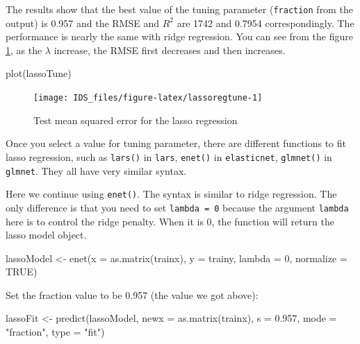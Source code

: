 \documentclass[
  12pt,
]{krantz}
\makeatletter
\newenvironment{Shaded}{\begin{snugshade}}{\end{snugshade}}
\newcommand{\AttributeTok}[1]{\textcolor[rgb]{0.61,0.61,0.61}{#1}}
\newcommand{\ConstantTok}[1]{\textcolor[rgb]{0,0,0}{#1}}
\newcommand{\DecValTok}[1]{\textcolor[rgb]{0.06,0.06,0.06}{#1}}
\newcommand{\FloatTok}[1]{\textcolor[rgb]{0.06,0.06,0.06}{#1}}
\newcommand{\FunctionTok}[1]{\textcolor[rgb]{0,0,0}{#1}}
\newcommand{\NormalTok}[1]{#1}
\newcommand{\OtherTok}[1]{\textcolor[rgb]{0.37,0.37,0.37}{#1}}
\newcommand{\StringTok}[1]{\textcolor[rgb]{0.5,0.5,0.5}{#1}}
\newenvironment{kframe}{%
\medskip{}
\setlength{\fboxsep}{.8em}
 \def\at@end@of@kframe{}%
 \ifinner\ifhmode%
  \def\at@end@of@kframe{\end{minipage}}%
  \begin{minipage}{\columnwidth}%
 \fi\fi%
 \def\FrameCommand##1{\hskip\@totalleftmargin \hskip-\fboxsep
 \colorbox{shadecolor}{##1}\hskip-\fboxsep
     \hskip-\linewidth \hskip-\@totalleftmargin \hskip\columnwidth}%
 \MakeFramed {\advance\hsize-\width
   \@totalleftmargin\z@ \linewidth\hsize
   \@setminipage}}%
 {\par\unskip\endMakeFramed%
 \at@end@of@kframe}
\renewenvironment{Shaded}{\begin{kframe}}{\end{kframe}}
\makeatother
\begin{document}
The results show that the best value of the tuning parameter (\texttt{fraction} from the output) is 0.957 and the RMSE and \(R^{2}\) are 1742 and 0.7954 correspondingly. The performance is nearly the same with ridge regression. You can see from the figure \ref{fig:lassoregtune}, as the \(\lambda\) increase, the RMSE first decreases and then increases.

\begin{Shaded}
\begin{Highlighting}[]
\FunctionTok{plot}\NormalTok{(lassoTune)}
\end{Highlighting}
\end{Shaded}

\begin{figure}

{\centering \texttt{[image: IDS\_files/figure-latex/lassoregtune-1]} 

}

\caption{Test mean squared error for the lasso regression}\label{fig:lassoregtune}
\end{figure}

Once you select a value for tuning parameter, there are different functions to fit lasso regression, such as \texttt{lars()} in \texttt{lars}, \texttt{enet()} in \texttt{elasticnet}, \texttt{glmnet()} in \texttt{glmnet}. They all have very similar syntax.

Here we continue using \texttt{enet()}. The syntax is similar to ridge regression. The only difference is that you need to set \texttt{lambda\ =\ 0} because the argument \texttt{lambda} here is to control the ridge penalty. When it is 0, the function will return the lasso model object.

\begin{Shaded}
\begin{Highlighting}[]
\NormalTok{lassoModel }\OtherTok{\textless{}{-}} \FunctionTok{enet}\NormalTok{(}\AttributeTok{x =} \FunctionTok{as.matrix}\NormalTok{(trainx), }\AttributeTok{y =}\NormalTok{ trainy, }
                   \AttributeTok{lambda =} \DecValTok{0}\NormalTok{, }\AttributeTok{normalize =} \ConstantTok{TRUE}\NormalTok{)}
\end{Highlighting}
\end{Shaded}

Set the fraction value to be 0.957 (the value we got above):

\begin{Shaded}
\begin{Highlighting}[]
\NormalTok{lassoFit }\OtherTok{\textless{}{-}} \FunctionTok{predict}\NormalTok{(lassoModel, }\AttributeTok{newx =} \FunctionTok{as.matrix}\NormalTok{(trainx), }
                    \AttributeTok{s =} \FloatTok{0.957}\NormalTok{, }\AttributeTok{mode =} \StringTok{"fraction"}\NormalTok{, }\AttributeTok{type =} \StringTok{"fit"}\NormalTok{)}
\end{Highlighting}
\end{Shaded}
\end{document}
